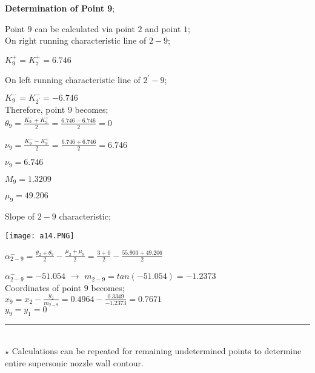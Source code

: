 \begin{appendices}
\noindent\textbf{Determination of Point 9};\\

\begin{minipage}{0.65\textwidth}
	
	Point $9$ can be calculated via point $2$ and point $1$;\\
	
	On right running characteristic line of $2-9$;
	
	$K_9^+ = K_7^+ = 6.746$
	
	On left running characteristic line of $2^{'}-9$;
	
	$K_9^- = K_{2^{'}}^- = -6.746$\\
	
	Therefore, point $9$ becomes;\\
	
	$\theta_9 = \frac{K_9^-+K_9^+}{2}=\frac{6.746-6.746}{2}=0$
	
	$\nu_9=\frac{K_9^--K_9^+}{2}=\frac{6.746+6.746}{2}=6.746$
	
	$\nu_9 = 6.746$
	
	$M_9=1.3209$
	
	$\mu_9=49.206$
	
	Slope of $2-9$ characteristic;\\
	
\end{minipage}
\begin{minipage}{0.35\textwidth}
	\texttt{[image: a14.PNG]}
\end{minipage}%
\noindent



${\alpha}^{-}_{2-9} = \frac{\theta_2+\theta_9}{2}-\frac{\mu_2+\mu_9}{2} = \frac{3+0}{2}-\frac{55.903+49.206}{2}$

${\alpha}_{2-9}^{-} = -51.054 $ $\rightarrow$  $m_{2-9} = tan(-51.054) = -1.2373$\\

Coordinates of point $9$ becomes;\\


	{\color{magenta}
		$x_9 = x_2-\frac{y_2}{m_{2-9}} = 0.4964 - \frac{0.3349}{-1.2373}=0.7671 $\\
		
		$y_9 = y_1 = 0$
	}\\

\noindent\rule{14cm}{0.8pt}\\

$\star$ Calculations can be repeated for remaining undetermined points to determine entire supersonic nozzle wall contour. 


\end{appendices}
